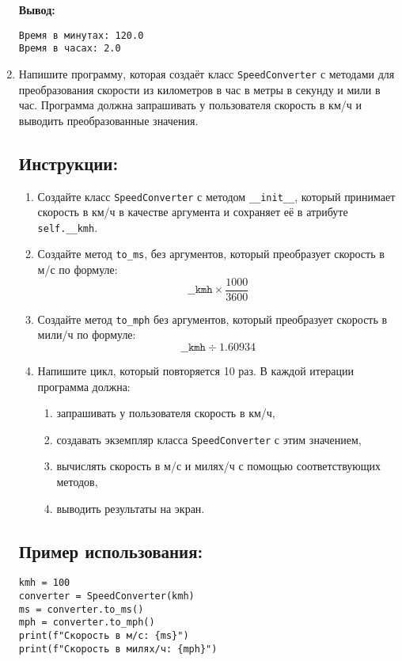 \begin{enumerate}
\textbf{Вывод:}
\begin{verbatim}
Время в минутах: 120.0
Время в часах: 2.0
\end{verbatim}

\item


Напишите программу, которая создаёт класс \texttt{SpeedConverter} с методами для преобразования скорости
из километров в час в метры в секунду и мили в час. Программа должна запрашивать у пользователя скорость в км/ч
и выводить преобразованные значения.

\subsection*{Инструкции:}
\begin{enumerate}
\item Создайте класс \texttt{SpeedConverter} с методом
\texttt{\_\_init\_\_}, который принимает скорость в км/ч в
качестве аргумента и сохраняет её в атрибуте \texttt{self.\_\_kmh}.

\item Создайте метод \texttt{to\_ms},
без аргументов, который преобразует скорость в м/с по формуле:
\[
\texttt{\_\_kmh} \times \frac{1000}{3600}
\]

\item Создайте метод \texttt{to\_mph} без аргументов,
который преобразует скорость в мили/ч по формуле:
\[
\texttt{\_\_kmh} \div 1.60934
\]

\item Напишите цикл, который повторяется 10 раз. В каждой итерации программа должна:
\begin{enumerate}
\item запрашивать у пользователя скорость в км/ч,
\item создавать экземпляр класса \texttt{SpeedConverter} с этим значением,
\item вычислять скорость в м/с и милях/ч с помощью соответствующих методов,
\item выводить результаты на экран.
\end{enumerate}
\end{enumerate}

\subsection*{Пример использования:}
\begin{verbatim}
kmh = 100
converter = SpeedConverter(kmh)
ms = converter.to_ms()
mph = converter.to_mph()
print(f"Скорость в м/с: {ms}")
print(f"Скорость в милях/ч: {mph}")
\end{verbatim}


\end{enumerate}
